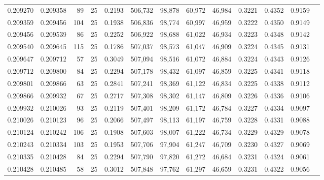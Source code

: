 \begin{tabular}{rrrrrrrrrrrrr}
0.209270 & 0.209358 &    89 &  25 &                                     0.2193 & 506,732 &  98,878 &  60,972 &  46,984 & 0.3221 & 0.4352 & 0.9159 \\
0.209359 & 0.209456 &   104 &  25 &                                     0.1938 & 506,836 &  98,774 &  60,997 &  46,959 & 0.3222 & 0.4350 & 0.9149 \\
0.209456 & 0.209539 &    86 &  25 &                                     0.2252 & 506,922 &  98,688 &  61,022 &  46,934 & 0.3223 & 0.4348 & 0.9142 \\
0.209540 & 0.209645 &   115 &  25 &                                     0.1786 & 507,037 &  98,573 &  61,047 &  46,909 & 0.3224 & 0.4345 & 0.9131 \\
0.209647 & 0.209712 &    57 &  25 &                                     0.3049 & 507,094 &  98,516 &  61,072 &  46,884 & 0.3224 & 0.4343 & 0.9126 \\
0.209712 & 0.209800 &    84 &  25 &                                     0.2294 & 507,178 &  98,432 &  61,097 &  46,859 & 0.3225 & 0.4341 & 0.9118 \\
0.209801 & 0.209866 &    63 &  25 &                                     0.2841 & 507,241 &  98,369 &  61,122 &  46,834 & 0.3225 & 0.4338 & 0.9112 \\
0.209866 & 0.209932 &    67 &  25 &                                     0.2717 & 507,308 &  98,302 &  61,147 &  46,809 & 0.3226 & 0.4336 & 0.9106 \\
0.209932 & 0.210026 &    93 &  25 &                                     0.2119 & 507,401 &  98,209 &  61,172 &  46,784 & 0.3227 & 0.4334 & 0.9097 \\
0.210026 & 0.210123 &    96 &  25 &                                     0.2066 & 507,497 &  98,113 &  61,197 &  46,759 & 0.3228 & 0.4331 & 0.9088 \\
0.210124 & 0.210242 &   106 &  25 &                                     0.1908 & 507,603 &  98,007 &  61,222 &  46,734 & 0.3229 & 0.4329 & 0.9078 \\
0.210243 & 0.210334 &   103 &  25 &                                     0.1953 & 507,706 &  97,904 &  61,247 &  46,709 & 0.3230 & 0.4327 & 0.9069 \\
0.210335 & 0.210428 &    84 &  25 &                                     0.2294 & 507,790 &  97,820 &  61,272 &  46,684 & 0.3231 & 0.4324 & 0.9061 \\
0.210428 & 0.210485 &    58 &  25 &                                     0.3012 & 507,848 &  97,762 &  61,297 &  46,659 & 0.3231 & 0.4322 & 0.9056 \\

\end{tabular}

